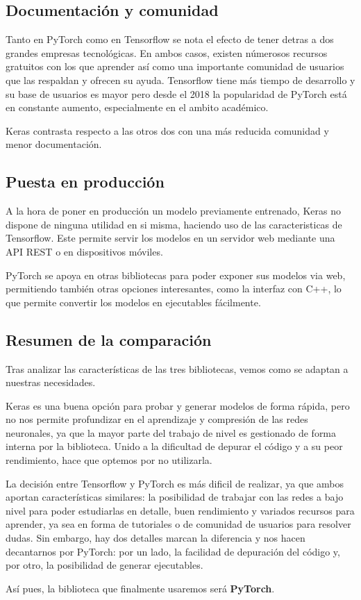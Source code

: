 \subsection{Documentación y comunidad}\label{documentacion-y-comunidad}

Tanto en PyTorch como en Tensorflow se nota el efecto de tener detras a
dos grandes empresas tecnológicas. En ambos casos, existen númerosos
recursos gratuitos con los que aprender así como una importante
comunidad de usuarios que las respaldan y ofrecen su ayuda. Tensorflow
tiene más tiempo de desarrollo y su base de usuarios es mayor pero desde
el 2018 la popularidad de PyTorch está en constante aumento,
especialmente en el ambito académico.

Keras contrasta respecto a las otros dos con una más reducida comunidad
y menor documentación.

\subsection{Puesta en producción}\label{puesta-en-produccion}

A la hora de poner en producción un modelo previamente entrenado, Keras
no dispone de ninguna utilidad en si misma, haciendo uso de las
caracteristicas de Tensorflow. Este permite servir los modelos en un
servidor web mediante una API REST o en dispositivos móviles.

PyTorch se apoya en otras bibliotecas para poder exponer sus modelos via
web, permitiendo también otras opciones interesantes, como la interfaz
con C++, lo que permite convertir los modelos en ejecutables fácilmente.

\subsection{Resumen de la comparación }\label{decision-final}

Tras analizar las características de las tres bibliotecas, vemos como se
adaptan a nuestras necesidades.

Keras es una buena opción para probar y generar modelos de forma rápida,
pero no nos permite profundizar en el aprendizaje y compresión de las
redes neuronales, ya que la mayor parte del trabajo de nivel es
gestionado de forma interna por la biblioteca. Unido a la dificultad de
depurar el código y a su peor rendimiento, hace que optemos por no
utilizarla.

La decisión entre Tensorflow y PyTorch es más dificil de realizar, ya
que ambos aportan características similares: la posibilidad de trabajar
con las redes a bajo nivel para poder estudiarlas en detalle, buen
rendimiento y variados recursos para aprender, ya sea en forma de
tutoriales o de comunidad de usuarios para resolver dudas. Sin embargo,
hay dos detalles marcan la diferencia y nos hacen decantarnos por
PyTorch: por un lado, la facilidad de depuración del código y, por otro,
la posibilidad de generar ejecutables.

Así pues, la biblioteca que finalmente usaremos será \textbf{PyTorch}.
